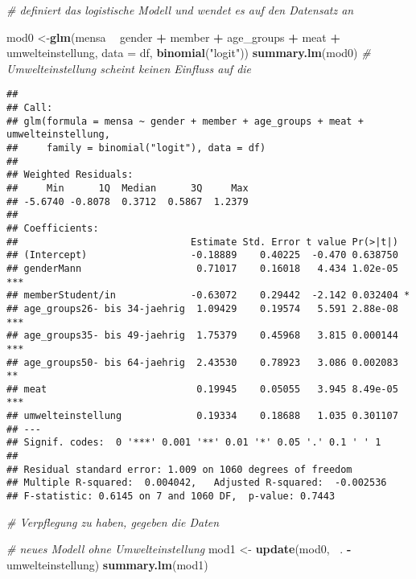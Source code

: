 \documentclass[
]{article}
\newenvironment{Shaded}{\begin{snugshade}}{\end{snugshade}}
\newcommand{\CommentTok}[1]{\textcolor[rgb]{0.56,0.35,0.01}{\textit{#1}}}
\newcommand{\DataTypeTok}[1]{\textcolor[rgb]{0.13,0.29,0.53}{#1}}
\newcommand{\KeywordTok}[1]{\textcolor[rgb]{0.13,0.29,0.53}{\textbf{#1}}}
\newcommand{\NormalTok}[1]{#1}
\newcommand{\OperatorTok}[1]{\textcolor[rgb]{0.81,0.36,0.00}{\textbf{#1}}}
\newcommand{\StringTok}[1]{\textcolor[rgb]{0.31,0.60,0.02}{#1}}
\begin{document}
\begin{Shaded}
\begin{Highlighting}[]
\CommentTok{# definiert das logistische Modell und wendet es auf den Datensatz an}

\NormalTok{mod0 <-}\KeywordTok{glm}\NormalTok{(mensa }\OperatorTok{~}\StringTok{ }\NormalTok{gender }\OperatorTok{+}\StringTok{ }\NormalTok{member }\OperatorTok{+}\StringTok{ }\NormalTok{age_groups }\OperatorTok{+}\StringTok{ }\NormalTok{meat }\OperatorTok{+}\StringTok{ }\NormalTok{umwelteinstellung, }
           \DataTypeTok{data =}\NormalTok{ df, }\KeywordTok{binomial}\NormalTok{(}\StringTok{"logit"}\NormalTok{))}
\KeywordTok{summary.lm}\NormalTok{(mod0) }\CommentTok{# Umwelteinstellung scheint keinen Einfluss auf die }
\end{Highlighting}
\end{Shaded}

\begin{verbatim}
## 
## Call:
## glm(formula = mensa ~ gender + member + age_groups + meat + umwelteinstellung, 
##     family = binomial("logit"), data = df)
## 
## Weighted Residuals:
##     Min      1Q  Median      3Q     Max 
## -5.6740 -0.8078  0.3712  0.5867  1.2379 
## 
## Coefficients:
##                              Estimate Std. Error t value Pr(>|t|)    
## (Intercept)                  -0.18889    0.40225  -0.470 0.638750    
## genderMann                    0.71017    0.16018   4.434 1.02e-05 ***
## memberStudent/in             -0.63072    0.29442  -2.142 0.032404 *  
## age_groups26- bis 34-jaehrig  1.09429    0.19574   5.591 2.88e-08 ***
## age_groups35- bis 49-jaehrig  1.75379    0.45968   3.815 0.000144 ***
## age_groups50- bis 64-jaehrig  2.43530    0.78923   3.086 0.002083 ** 
## meat                          0.19945    0.05055   3.945 8.49e-05 ***
## umwelteinstellung             0.19334    0.18688   1.035 0.301107    
## ---
## Signif. codes:  0 '***' 0.001 '**' 0.01 '*' 0.05 '.' 0.1 ' ' 1
## 
## Residual standard error: 1.009 on 1060 degrees of freedom
## Multiple R-squared:  0.004042,   Adjusted R-squared:  -0.002536 
## F-statistic: 0.6145 on 7 and 1060 DF,  p-value: 0.7443
\end{verbatim}

\begin{Shaded}
\begin{Highlighting}[]
\CommentTok{# Verpflegung zu haben, gegeben die Daten}

\CommentTok{# neues Modell ohne Umwelteinstellung}
\NormalTok{mod1 <-}\StringTok{ }\KeywordTok{update}\NormalTok{(mod0, }\OperatorTok{~}\NormalTok{. }\OperatorTok{-}\NormalTok{umwelteinstellung)}
\KeywordTok{summary.lm}\NormalTok{(mod1)}
\end{Highlighting}
\end{Shaded}
\end{document}
